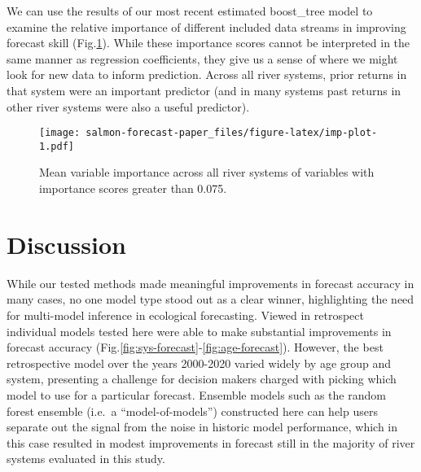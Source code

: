 \documentclass[
]{article}
\begin{document}
We can use the results of our most recent estimated boost\_tree model to examine the relative importance of different included data streams in improving forecast skill (Fig.\ref{fig:imp-plot}). While these importance scores cannot be interpreted in the same manner as regression coefficients, they give us a sense of where we might look for new data to inform prediction. Across all river systems, prior returns in that system were an important predictor (and in many systems past returns in other river systems were also a useful predictor).

\begin{figure}
\centering
\texttt{[image: salmon-forecast-paper\_files/figure-latex/imp-plot-1.pdf]}
\caption{\label{fig:imp-plot}Mean variable importance across all river systems of variables with importance scores greater than 0.075.}
\end{figure}

\hypertarget{discussion}{%
\section{Discussion}\label{discussion}}

While our tested methods made meaningful improvements in forecast accuracy in many cases, no one model type stood out as a clear winner, highlighting the need for multi-model inference in ecological forecasting. Viewed in retrospect individual models tested here were able to make substantial improvements in forecast accuracy (Fig.\ref{fig:sys-forecast}-\ref{fig:age-forecast}). However, the best retrospective model over the years 2000-2020 varied widely by age group and system, presenting a challenge for decision makers charged with picking which model to use for a particular forecast. Ensemble models such as the random forest ensemble (i.e.~a ``model-of-models'') constructed here can help users separate out the signal from the noise in historic model performance, which in this case resulted in modest improvements in forecast still in the majority of river systems evaluated in this study.
\end{document}
